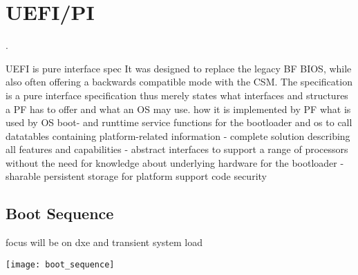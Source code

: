 
\section{\acs{UEFI}/\acs{PI}}
.

UEFI is pure interface spec
\cite{beyond-bios}
It was designed to replace the legacy \acl{BF} \ac{BIOS}, while also often offering a backwards compatible mode with the \acf{CSM}.
The specification is a pure interface specification thus merely states what interfaces and structures a \ac{PF} has to offer and what an \ac{OS} may use.
how it is implemented by PF
what is used by OS
boot- and runttime service functions for the bootloader and os to call
datatables containing platform-related information
- complete solution describing all features and capabilities
- abstract interfaces to support a range of processors without the need for knowledge about underlying hardware for the bootloader
- sharable persistent storage for platform support code
security

\subsection{Boot Sequence}


focus will be on dxe and transient system load

\texttt{[image: boot\_sequence]}


